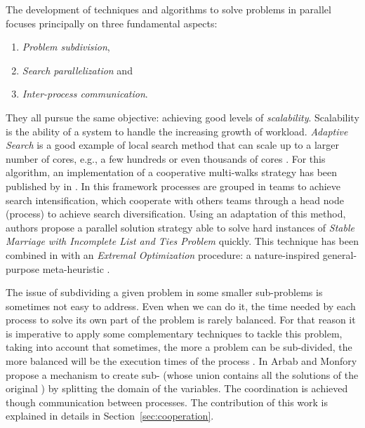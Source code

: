 The development of techniques and algorithms to solve problems in parallel focuses principally on three fundamental aspects: 
\begin{enumerate}%
    \item {\it Problem subdivision},
    \item {\it Search parallelization} and %
    \item {\it Inter-process communication}.
\end{enumerate}%
They all pursue the same objective: achieving good levels of \textit{scalability}. Scalability is the ability of a system to handle the increasing growth of workload. 
\textit{Adaptive Search} is a good example of local search method that can scale up to a larger number of cores, e.g., a few hundreds or even thousands of cores \cite{Diaz}. For this algorithm, an implementation of a cooperative multi-walks strategy has been published by  in \cite{Munera}. In this framework processes are grouped in teams to achieve search intensification, which cooperate with others teams through a head node (process) to achieve search diversification. Using an adaptation of this method, authors propose a parallel solution strategy able to solve hard instances of \textit{Stable Marriage with Incomplete List and Ties Problem} quickly. This technique has been combined in \cite{Munera2016} with an \textit{Extremal Optimization} procedure: a nature-inspired general-purpose meta-heuristic \cite{Boettcher2000}.
	
The issue of subdividing a given problem in some smaller sub-problems is sometimes not easy to address. Even when we can do it, the time needed by each process to solve its own part of the problem is rarely balanced. For that reason it is imperative to apply some complementary techniques to tackle this problem, taking into account that sometimes, the more a problem can be sub-divided, the more balanced will be the execution times of the process \cite{Hill}.%
In \cite{Arbab2000} Arbab and Monfory propose a mechanism to create sub-\csps{} (whose union contains all the solutions of the original \csp) by splitting the domain of the variables. The coordination is achieved though communication between processes. The contribution of this work is explained in details in Section~\ref{sec:cooperation}. 

